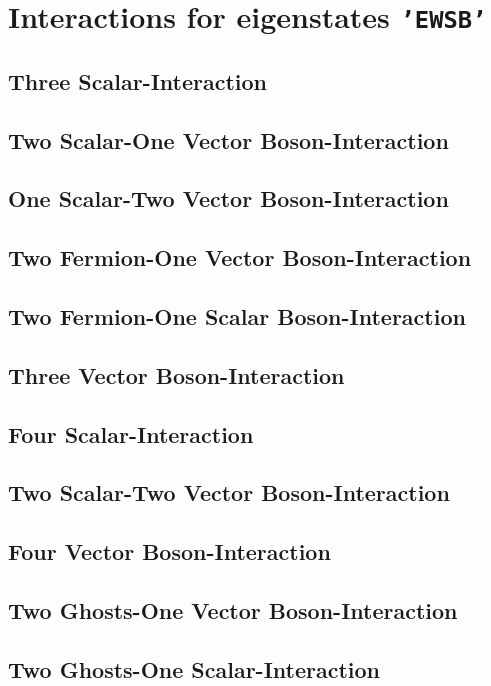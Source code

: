 \documentclass[A4]{article}
\begin{document}
\section{Interactions for eigenstates {\tt 'EWSB'}}
\subsection{Three Scalar-Interaction}

\subsection{Two Scalar-One Vector Boson-Interaction}

\subsection{One Scalar-Two Vector Boson-Interaction}

\subsection{Two Fermion-One Vector Boson-Interaction}

\subsection{Two Fermion-One Scalar Boson-Interaction}

\subsection{Three Vector Boson-Interaction}

\subsection{Four Scalar-Interaction}

\subsection{Two Scalar-Two Vector Boson-Interaction}

\subsection{Four Vector Boson-Interaction}

\subsection{Two Ghosts-One Vector Boson-Interaction}

\subsection{Two Ghosts-One Scalar-Interaction}


\end{document}
